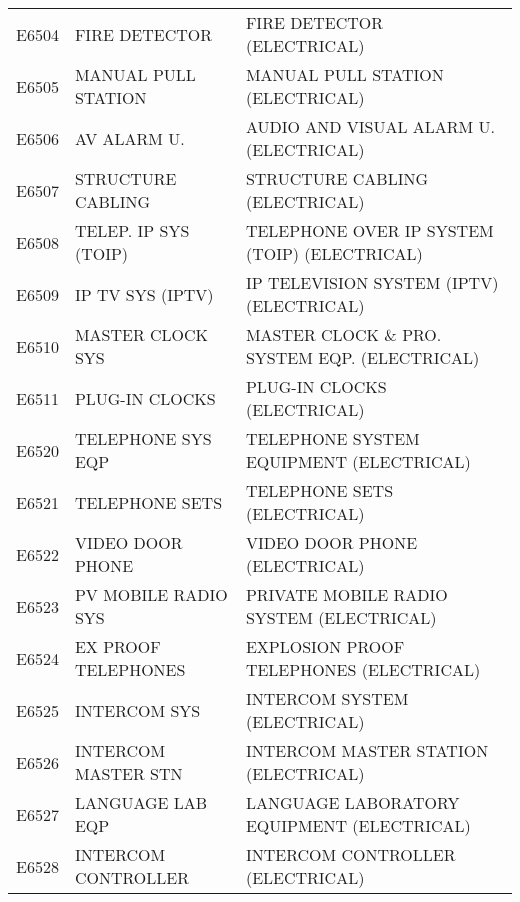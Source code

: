 \begin{longtable}[l]{l%
                  l|%
                  l|}
\rowcolor{thetableheadbgcolor!0.25!white} E6504       & FIRE DETECTOR   & FIRE DETECTOR (ELECTRICAL)   \\
\rowcolor{thetableheadbgcolor!0.25!white} E6505       & MANUAL PULL STATION   & MANUAL PULL STATION (ELECTRICAL)   \\
\rowcolor{thetableheadbgcolor!0.25!white} E6506       & AV ALARM U.   & AUDIO AND VISUAL ALARM U. (ELECTRICAL)   \\
\rowcolor{thetableheadbgcolor!0.25!white} E6507       & STRUCTURE CABLING   & STRUCTURE CABLING (ELECTRICAL)   \\
\rowcolor{thetableheadbgcolor!0.25!white} E6508       & TELEP. IP SYS (TOIP)   & TELEPHONE OVER IP SYSTEM (TOIP) (ELECTRICAL)   \\
\rowcolor{thetableheadbgcolor!0.25!white} E6509       & IP TV SYS (IPTV)   & IP TELEVISION SYSTEM (IPTV) (ELECTRICAL)   \\
\rowcolor{thetableheadbgcolor!0.25!white} E6510       & MASTER CLOCK SYS   & MASTER CLOCK \& PRO. SYSTEM EQP. (ELECTRICAL)   \\
\rowcolor{thetableheadbgcolor!0.25!white} E6511       & PLUG-IN CLOCKS   & PLUG-IN CLOCKS (ELECTRICAL)   \\
\rowcolor{thetableheadbgcolor!0.25!white} E6520       & TELEPHONE SYS EQP   & TELEPHONE SYSTEM EQUIPMENT (ELECTRICAL)   \\
\rowcolor{thetableheadbgcolor!0.25!white} E6521       & TELEPHONE SETS   & TELEPHONE SETS (ELECTRICAL)   \\
\rowcolor{thetableheadbgcolor!0.25!white} E6522       & VIDEO DOOR PHONE   & VIDEO DOOR PHONE (ELECTRICAL)   \\
\rowcolor{thetableheadbgcolor!0.25!white} E6523       & PV MOBILE RADIO SYS   & PRIVATE MOBILE RADIO SYSTEM (ELECTRICAL)   \\
\rowcolor{thetableheadbgcolor!0.25!white} E6524       & EX PROOF TELEPHONES   & EXPLOSION PROOF TELEPHONES (ELECTRICAL)   \\
\rowcolor{thetableheadbgcolor!0.25!white} E6525       & INTERCOM SYS   & INTERCOM SYSTEM (ELECTRICAL)   \\
\rowcolor{thetableheadbgcolor!0.25!white} E6526       & INTERCOM MASTER STN   & INTERCOM MASTER STATION (ELECTRICAL)   \\
\rowcolor{thetableheadbgcolor!0.25!white} E6527       & LANGUAGE LAB EQP   & LANGUAGE LABORATORY EQUIPMENT (ELECTRICAL)   \\
\rowcolor{thetableheadbgcolor!0.25!white} E6528       & INTERCOM CONTROLLER   & INTERCOM CONTROLLER (ELECTRICAL)   \\

\end{longtable}

